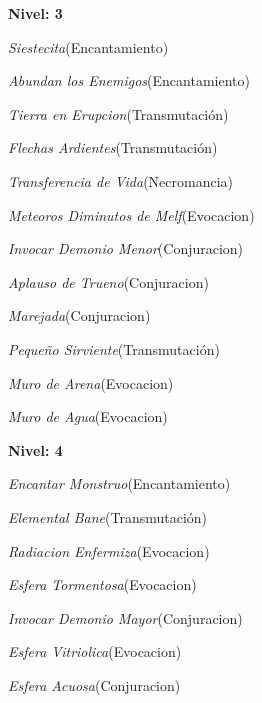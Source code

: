 \documentclass[a4paper,twocolumn,openany,10pt]{dndbook}
\begin{document}
\begin{list}{}{}
	\item \textbf{Nivel: 3}
	\begin{list}{}{}
		\item \textit{Siestecita}(Encantamiento)
		\item \textit{Abundan los Enemigos}(Encantamiento)
		\item \textit{Tierra en Erupcion}(Transmutación)
		\item \textit{Flechas Ardientes}(Transmutación)
		\item \textit{Transferencia de Vida}(Necromancia)
		\item \textit{Meteoros Diminutos de Melf}(Evocacion)
		\item \textit{Invocar Demonio Menor}(Conjuracion)
		\item \textit{Aplauso de Trueno}(Conjuracion)
		\item \textit{Marejada}(Conjuracion)
		\item \textit{Pequeño Sirviente}(Transmutación)
		\item \textit{Muro de Arena}(Evocacion)
		\item \textit{Muro de Agua}(Evocacion)
	\end{list}

	\item \textbf{Nivel: 4}
	\begin{list}{}{}
		\item \textit{Encantar Monstruo}(Encantamiento)
		\item \textit{Elemental Bane}(Transmutación)
		\item \textit{Radiacion Enfermiza}(Evocacion)
		\item \textit{Esfera Tormentosa}(Evocacion)
		\item \textit{Invocar Demonio Mayor}(Conjuracion)
		\item \textit{Esfera Vitriolica}(Evocacion)
		\item \textit{Esfera Acuosa}(Conjuracion)
	\end{list}


\end{list}
\end{document}
